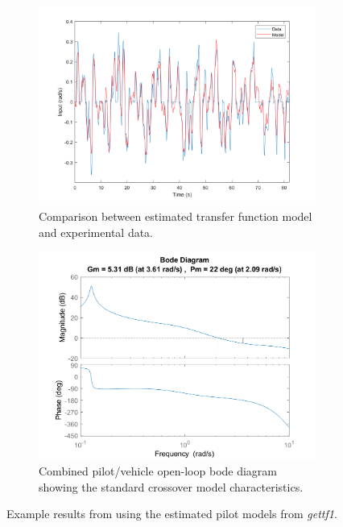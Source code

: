 \begin{figure}[h]
    \centering
    \begin{subfigure}[b]{0.49\textwidth}
        \centering
        \includegraphics[width=\textwidth]{figures/model_output.png}
        \caption{Comparison between estimated transfer function model and experimental data.}
        \label{fig:comparison}
    \end{subfigure}
    \hfill
    \begin{subfigure}[b]{0.49\textwidth}
        \centering
        \includegraphics[width=\textwidth]{figures/YpYc_204.png}
        \caption{Combined pilot/vehicle open-loop bode diagram showing the standard crossover model characteristics.}
        \label{fig:bode}
    \end{subfigure}
    \caption{Example results from using the estimated pilot models from \textit{gettf1}.}
\end{figure}

